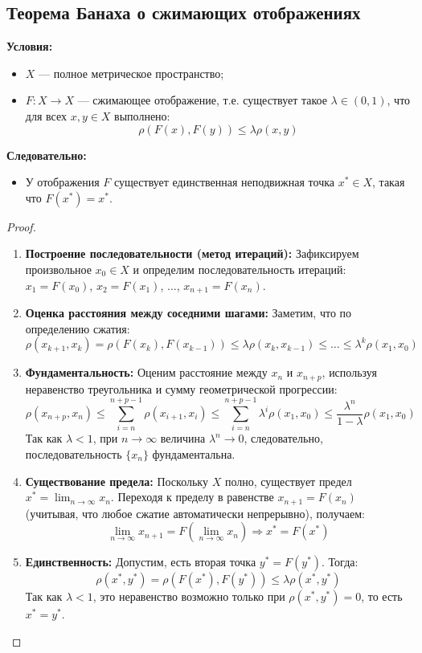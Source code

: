 \subsection{Теорема Банаха о сжимающих отображениях}
\begin{theorem}\label{banach-compact}
	\textbf{Условия:}
	\begin{itemize}
		\item $X$ --- полное метрическое пространство;
		\item $F: X \to X$ --- сжимающее отображение, т.е. существует такое $\lambda \in (0, 1)$, что для всех $x, y \in X$ выполнено:
		\[ \rho(F(x), F(y)) \leqslant \lambda \rho(x, y) \]
	\end{itemize}
	\textbf{Следовательно:}
	\begin{itemize}
		\item У отображения $F$ существует единственная неподвижная точка $x^* \in X$, такая что $F(x^*) = x^*$.
	\end{itemize}
\end{theorem}
 
\begin{proof}
	\begin{enumerate}
		\item \textbf{Построение последовательности (метод итераций):} Зафиксируем произвольное $x_0 \in X$ и определим последовательность итераций: $x_1 = F(x_0)$, $x_2 = F(x_1)$, ..., $x_{n+1} = F(x_n)$.
		
		\item \textbf{Оценка расстояния между соседними шагами:} Заметим, что по определению сжатия:
		\[ \rho(x_{k+1}, x_k) = \rho(F(x_k), F(x_{k-1})) \leqslant \lambda \rho(x_k, x_{k-1}) \leqslant \dots \leqslant \lambda^k \rho(x_1, x_0) \]
		
		\item \textbf{Фундаментальность:} Оценим расстояние между $x_n$ и $x_{n+p}$, используя неравенство треугольника и сумму геометрической прогрессии:
		\[ \rho(x_{n+p}, x_n) \leqslant \sum_{i=n}^{n+p-1} \rho(x_{i+1}, x_i) \leqslant \sum_{i=n}^{n+p-1} \lambda^i \rho(x_1, x_0) \leqslant \frac{\lambda^n}{1 - \lambda} \rho(x_1, x_0) \]
		Так как $\lambda < 1$, при $n \to \infty$ величина $\lambda^n \to 0$, следовательно, последовательность $\{x_n\}$ фундаментальна.
		
		\item \textbf{Существование предела:} Поскольку $X$ полно, существует предел $x^* = \lim_{n \to \infty} x_n$. Переходя к пределу в равенстве $x_{n+1} = F(x_n)$ (учитывая, что любое сжатие автоматически непрерывно), получаем:
		\[ \lim_{n \to \infty} x_{n+1} = F(\lim_{n \to \infty} x_n) \Rightarrow x^* = F(x^*) \]
		
		\item \textbf{Единственность:} Допустим, есть вторая точка $y^* = F(y^*)$. Тогда:
		\[ \rho(x^*, y^*) = \rho(F(x^*), F(y^*)) \leqslant \lambda \rho(x^*, y^*) \]
		Так как $\lambda < 1$, это неравенство возможно только при $\rho(x^*, y^*) = 0$, то есть $x^* = y^*$.
	\end{enumerate}
\end{proof}